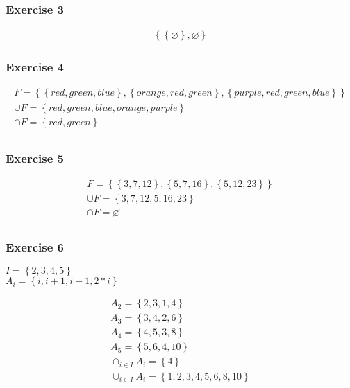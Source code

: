 \subsubsection{Exercise 3}
\begin{align*}
  \left\{\left\{\varnothing\right\}, \varnothing \right\}
\end{align*}

\subsubsection{Exercise 4}
\begin{align*}
  F = \left\{ \left\{red, green, blue \right\}, \left\{orange, red,
  green\right\}, \left\{purple, red, green, blue \right\} \right\} \\
  \cup F = \left\{ red, green, blue, orange, purple\right\} \\
  \cap F = \left\{ red, green\right\} \\
\end{align*}

\subsubsection{Exercise 5}
\begin{align*}
  F = \left\{ \left\{3,7,12 \right\}, \left\{5,7,16
  \right\}, \left\{5,12,23 \right\} \right\} \\
  \cup F = \left\{ 3,7,12,5,16,23 \right\} \\
  \cap F = \varnothing \\
\end{align*}

\subsubsection{Exercise 6}
\begin{center}
  $I = \left\{2,3,4,5\right\}$ \\
  $A_i = \left\{i, i+1, i-1, 2*i\right\}$ \\
\end{center}
\begin{align*}
  A_2 = \left\{2,3,1,4\right\} \\
  A_3 = \left\{3,4,2,6\right\} \\
  A_4 = \left\{4,5,3,8\right\} \\
  A_5 = \left\{5,6,4,10\right\} \\
  \cap_{i \in I}A_i = \left\{4 \right\} \\
  \cup_{i \in I}A_i = \left\{1,2,3,4,5,6,8,10 \right\} \\
\end{align*}

